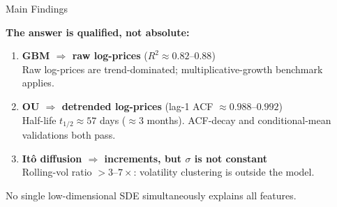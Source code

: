 \documentclass[aspectratio=169,10pt]{beamer}
\begin{document}
\begin{frame}{Main Findings}

\textbf{The answer is qualified, not absolute:}

\medskip
\begin{enumerate}\setlength{\itemsep}{8pt}

  \item \textbf{GBM $\Rightarrow$ raw log-prices} ($R^2\approx 0.82$--$0.88$)\\
        \small Raw log-prices are trend-dominated; multiplicative-growth benchmark applies.

  \item \textbf{OU $\Rightarrow$ detrended log-prices} (lag-1 ACF $\approx 0.988$--$0.992$)\\
        \small Half-life $t_{1/2}\approx 57$ days ($\approx 3$ months).
        ACF-decay and conditional-mean validations both pass.

  \item \textbf{It\^{o} diffusion $\Rightarrow$ increments, but $\sigma$ is not constant}\\
        \small Rolling-vol ratio $>3$--$7\times$: volatility clustering is outside the model.

\end{enumerate}

\medskip\small
No single low-dimensional SDE simultaneously explains all features.

\end{frame}
\end{document}
